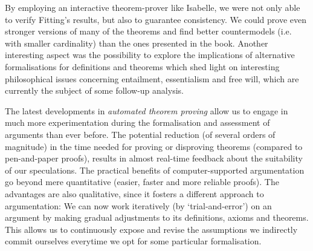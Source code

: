 \begin{isabellebody}
\begin{isamarkuptext}
By employing an interactive theorem-prover like Isabelle, we were not only able to verify Fitting's results,
but also to guarantee consistency. We could prove even stronger versions
of many of the theorems and find better countermodels (i.e. with smaller cardinality) than the ones presented in the book.
Another interesting aspect was the possibility to explore the implications of alternative formalisations
for definitions and theorems which shed light on interesting philosophical issues concerning entailment,
essentialism and free will, which are currently the subject of some follow-up analysis.%
\end{isamarkuptext}\isamarkuptrue%
%
\begin{isamarkuptext}%
The latest developments in \emph{automated theorem proving} allow us to engage in much more experimentation
during the formalisation and assessment of arguments than ever before. The potential reduction (of several orders of magnitude)
in the time needed for proving or disproving theorems (compared to pen-and-paper proofs), results in almost real-time
feedback about the suitability of our speculations. The practical benefits of computer-supported argumentation go beyond
mere quantitative (easier, faster and more reliable proofs). The advantages are also qualitative, since it fosters a
different approach to argumentation: We can now work iteratively (by `trial-and-error') on an argument
by making gradual adjustments to its definitions, axioms and theorems. This allows us to continuously expose and revise 
the assumptions we indirectly commit ourselves everytime we opt for some particular formalisation.%
\end{isamarkuptext}\isamarkuptrue%
%
%
%
%
%
%
%
\end{isabellebody}%
